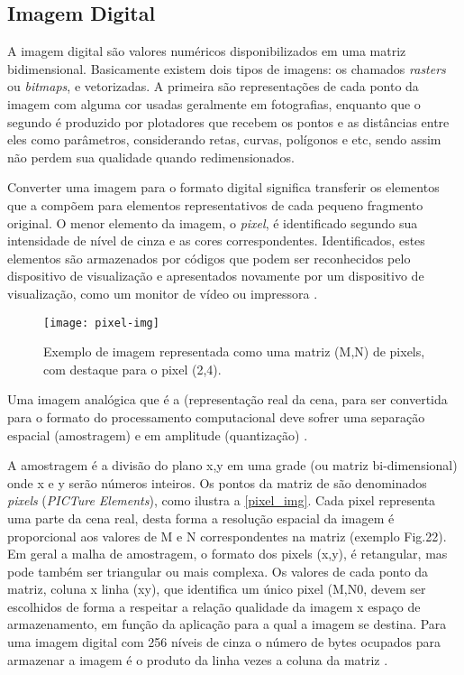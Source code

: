 \subsection{Imagem Digital}\label{subsec:imagem}

A imagem digital são valores numéricos disponibilizados em uma matriz bidimensional. Basicamente existem dois tipos de imagens: os chamados \textit{rasters} ou \textit{bitmaps}, e vetorizadas. A primeira são representações de cada ponto da imagem com alguma cor usadas geralmente em fotografias, enquanto que o segundo é produzido por plotadores que recebem os pontos e as distâncias entre eles como parâmetros, considerando retas, curvas, polígonos e etc, sendo assim não perdem sua qualidade quando redimensionados.

Converter uma imagem para o formato digital significa transferir os elementos que a compõem para elementos representativos de cada pequeno fragmento original. O menor elemento da imagem, o \textit{pixel}, é identificado segundo sua intensidade de nível de cinza e as cores correspondentes. Identificados, estes elementos são armazenados por códigos que podem ser reconhecidos pelo dispositivo de visualização e apresentados novamente por um dispositivo de visualização, como um monitor de vídeo ou impressora \cite{img-digital-willians}. 

\begin{figure}[h]
	\centering
	\texttt{[image: pixel-img]}
	\caption{Exemplo de imagem representada como uma matriz (M,N) de pixels, com destaque para o pixel (2,4).}
	\label{pixel_img}
\end{figure}


Uma imagem analógica que é a (representação real da cena, para ser convertida para o formato do
processamento computacional deve sofrer uma separação espacial (amostragem) e em amplitude
(quantização) \cite{img-digital-willians}. 

A amostragem é a divisão do plano x,y em uma grade (ou matriz bi-dimensional) onde x e y serão números inteiros. Os pontos da matriz de são denominados \textit{pixels} (\textit{PICTure Elements}), como ilustra a \autoref{pixel_img}. Cada pixel representa uma parte da cena real, desta forma a resolução espacial da imagem é proporcional aos valores de M e N correspondentes na matriz (exemplo Fig.22). Em geral a malha de amostragem, o formato dos pixels (x,y), é retangular, mas pode também ser triangular ou mais complexa. Os valores de cada ponto da matriz, coluna x linha (xy), que identifica um único pixel (M,N0, devem ser escolhidos de forma a respeitar a relação qualidade da imagem x espaço de armazenamento, em função da aplicação para a qual a imagem se destina. Para uma imagem digital com 256 níveis de cinza o número de bytes ocupados para armazenar a imagem é o produto da linha vezes a coluna da matriz \cite{img-digital-willians}. 

